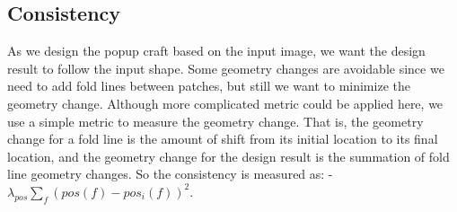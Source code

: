 \subsection{Consistency}
As we design the popup craft based on the input image, we want the design result to follow the input shape. Some geometry changes are avoidable since we need to add fold lines between patches, but still we want to minimize the geometry change. Although more complicated metric could be applied here, we use a simple metric to measure the geometry change. That is, the geometry change for a fold line is the amount of shift from its initial location to its final location, and the geometry change for the design result is the summation of fold line geometry changes. So the consistency is measured as: -$\lambda_{pos}\sum_f(pos(f) - pos_i(f))^2$.